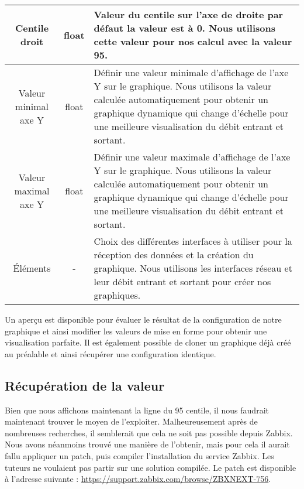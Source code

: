 \begin{tabular}{|c|c|m{9cm}|}
\hline
Centile droit & float & Valeur du centile sur l'axe de droite par défaut la valeur est à 0. Nous utilisons cette valeur pour nos calcul avec la valeur 95. \\

\hline
Valeur minimal axe Y & float & Définir une valeur minimale d'affichage de l'axe Y sur le graphique. Nous utilisons la valeur calculée automatiquement pour obtenir un graphique dynamique qui change d'échelle pour une meilleure visualisation du débit entrant et sortant. \\

\hline
Valeur maximal axe Y & float & Définir une valeur maximale d'affichage de l'axe Y sur le graphique. Nous utilisons la valeur calculée automatiquement pour obtenir un graphique dynamique qui change d'échelle pour une meilleure visualisation du débit entrant et sortant. \\

\hline
Éléments & - & Choix des différentes interfaces à utiliser pour la réception des données et la création du graphique. Nous utilisons les interfaces réseau et leur débit entrant et sortant pour créer nos graphiques. \\

\hline
\end{tabular}

\vspace{0.3cm}

		Un aperçu est disponible pour évaluer le résultat de la configuration de notre graphique et ainsi modifier les valeurs de mise en forme pour obtenir une visualisation parfaite. Il est également possible de cloner un graphique déjà créé au préalable et ainsi récupérer une configuration identique.\\

	\subsection{Récupération de la valeur}
		\vspace{0.3cm}

		Bien que nous affichons maintenant la ligne du 95 centile, il nous faudrait maintenant trouver le moyen de l'exploiter. Malheureusement après de nombreuses recherches, il semblerait que cela ne soit pas possible depuis Zabbix. Nous avons néanmoins trouvé une manière de l'obtenir, mais pour cela il aurait fallu appliquer un patch, puis compiler l'installation du service Zabbix. Les tuteurs ne voulaient pas partir sur une solution compilée. Le patch est disponible à l'adresse suivante : \url{https://support.zabbix.com/browse/ZBXNEXT-756}.


\newpage		
